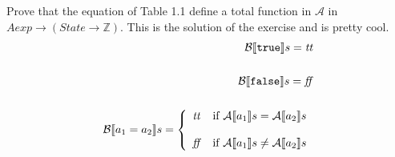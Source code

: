 \documentclass[
10pt, %
a4paper, %
oneside, %
fleqn,
leqno,
headinclude,footinclude, %
BCOR5mm, %
]{scrartcl}
\begin{document}
\maketitle 
\setcounter{tocdepth}{3} 
\setcounter{secnumdepth}{0}
\tableofcontents 

\newpage 

{Prove that the equation of Table 1.1 define a total function in $\mathcal{A}$ in $Aexp \rightarrow (State \rightarrow \mathbb{Z})$.}
{
 This is the solution of the exercise and is pretty cool.
  \begin{align*}
  \B{\syntrue} = \semtrue \\ \\
  \B{\synfalse} = \semfalse \\ \\
  \B{a_1 = a_2} = \caseFun{\semtrue}{\A{a_1} = \A{a_2}}{\semfalse}{\A{a_1} \neq 
\A{a_2}} \\ \\
  \end{align*}
}


\end{document}
